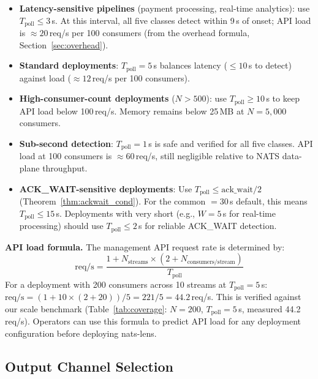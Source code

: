 \documentclass[journal]{IEEEtran}
\begin{document}
\begin{itemize}
\item \textbf{Latency-sensitive pipelines} (payment processing,
  real-time analytics): use $T_\text{poll} \leq 3$\,s. At this
  interval, all five classes detect within 9\,s of onset; API
  load is $\approx 20$\,req/s per 100 consumers (from the overhead
  formula, Section~\ref{sec:overhead}).

\item \textbf{Standard deployments}: $T_\text{poll} = 5$\,s balances
  latency ($\leq 10$\,s to detect) against load ($\approx 12$\,req/s
  per 100 consumers).

\item \textbf{High-consumer-count deployments} ($N > 500$): use
  $T_\text{poll} \geq 10$\,s to keep API load below 100\,req/s.
  Memory remains below 25\,MB at $N{=}5{,}000$ consumers.

\item \textbf{Sub-second detection}: $T_\text{poll} = 1$\,s is safe
  and verified for all five classes. API load at 100 consumers is
  $\approx 60$\,req/s, still negligible relative to NATS data-plane
  throughput.

\item \textbf{ACK\_WAIT-sensitive deployments}: Use
  $T_\text{poll} \leq \text{ack\_wait}/2$ (Theorem~\ref{thm:ackwait_cond}).
  For the common $=30$\,s default, this means
  $T_\text{poll} \leq 15$\,s. Deployments with very short
   (e.g., $W=5$\,s for real-time processing) should
  use $T_\text{poll} \leq 2$\,s for reliable ACK\_WAIT detection.
\end{itemize}

\textbf{API load formula.} The management API request rate is determined by:
\[
  \text{req/s} = \frac{1 + N_\text{streams} \times (2 + N_\text{consumers/stream})}{T_\text{poll}}
\]
For a deployment with 200 consumers across 10 streams at $T_\text{poll}=5$\,s:
$\text{req/s} = (1 + 10 \times (2 + 20))/5 = 221/5 = 44.2$\,req/s.
This is verified against our scale benchmark
(Table~\ref{tab:coverage}: $N{=}200$, $T_\text{poll}{=}5$\,s,
measured 44.2\,req/s). Operators can use this formula to predict API
load for any deployment configuration before deploying nats-lens.

\subsection{Output Channel Selection}
\end{document}
